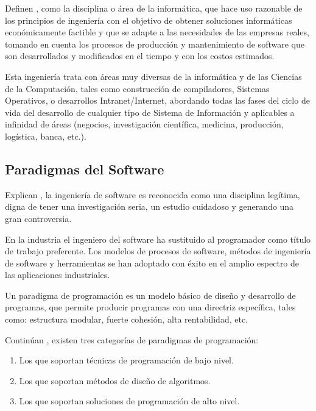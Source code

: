 \documentclass[12pt]{article}
\begin{document}
	Definen \textcite{maida_metodologias_2015}, como la disciplina o área de la informática, que hace uso razonable de los principios de ingeniería con el objetivo de obtener soluciones informáticas económicamente factible y que se adapte a las necesidades de las empresas reales, tomando en cuenta los procesos de producción y mantenimiento de software que son desarrollados y modificados en el tiempo y con los costos estimados.

	Esta ingeniería trata con áreas muy diversas de la informática y de las Ciencias de la Computación, tales como construcción de compiladores, Sistemas Operativos, o desarrollos Intranet/Internet, abordando todas las fases del ciclo de vida del desarrollo de cualquier tipo de Sistema de Información y aplicables a infinidad de áreas (negocios, investigación científica, medicina, producción, logística, banca, etc.).

	\subsection{Paradigmas del Software}

	Explican \textcite{maida_metodologias_2015}, la ingeniería de software es reconocida como una disciplina legítima, digna de tener una investigación seria, un estudio cuidadoso y generando una gran controversia.

	En la industria el ingeniero del software ha sustituido al programador como título de trabajo preferente. Los modelos de procesos de software, métodos de ingeniería de software y herramientas se han adoptado con éxito en el amplio espectro de las aplicaciones industriales.

	Un paradigma de programación es un modelo básico de diseño y desarrollo de programas, que	permite producir programas con una directriz específica, tales como: estructura modular, fuerte cohesión, alta rentabilidad, etc.

	Continúan \textcite{maida_metodologias_2015}, existen tres categorías de paradigmas de programación:

	\begin{enumerate}[left=1.27cm]
		\item Los que soportan técnicas de programación de bajo nivel.
		\item Los que soportan métodos de diseño de algoritmos.
		\item Los que soportan soluciones de programación de alto nivel.
	\end{enumerate}
\end{document}
